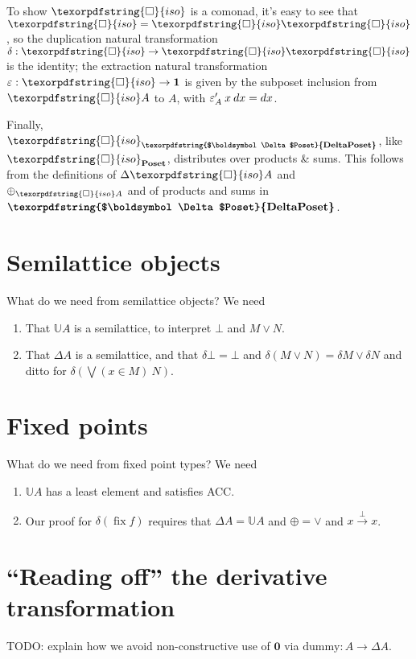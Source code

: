 \documentclass{rntz}\usepackage[a5]{rntzgeometry}\usepackage[fullwidth=13cm,width=320pt,width=115mm]{narrow}
\newcommand\mathvar[1]{\ensuremath{#1}} %
\newcommand\todo[1]{{\color{ACMRed}#1}}
\newcommand\cat\textbf
\newcommand\CP{\cat{\texorpdfstring{$\boldsymbol\Delta$Poset}{DeltaPoset}}}
\newcommand\Poset{\cat{Poset}}
\newcommand\D\Delta
\newcommand\zero{\ensuremath{\mathbold{0}}}
\newcommand\<{\mskip 4mu plus 4mu minus 1mu}
\newcommand\dx{\mathvar{dx}}
\newcommand\iso{{\texorpdfstring{\ensuremath{\square}}{iso}}}
\newcommand\isof{\iso}
\newcommand\fname\text
\newcommand\valfn{\ensuremath{\mathbb{U}}}
\newcommand\vals{\valfn}
\newcommand\chgs[1]{\D{#1}}
\newcommand\deriv[1]{\ensuremath{#1'}}
\newcommand\upd{\mathbin{\oplus}}
\newcommand\updfn{\ensuremath{{\upd}}}
\newcommand\validarrow\to
\newcommand\valid[1]{\mathrel{\overset{#1}{\validarrow}}}
\begin{document}
\noindent
To show $\iso$ is a comonad, it's easy to see that ${\iso} = {\iso\iso}$, so the
duplication natural transformation $\delta : {\iso} \to {\iso\iso}$ is the
identity; the extraction natural transformation $\varepsilon : {\iso} \to
\mathbold{1}$ is given by the subposet inclusion from $\isof A$ to $A$, with
$\deriv{\varepsilon_A} \<x \<\dx = \dx$.

Finally, $\iso_\CP$, like $\iso_\Poset$, distributes over products \& sums. This
follows from the definitions of $\chgs{\iso A}$ and $\updfn_{\iso A}$ and of
products and sums in $\CP$.


\section{Semilattice objects}

\todo{What do we need from semilattice objects? We need
  \begin{enumerate}
  \item That $\vals A$ is a semilattice, to interpret $\bot$ and $M \vee N$.
  \item That $\chgs A$ is a semilattice, and that $\delta\bot = \bot$ and
    $\delta(M \vee N) = \delta M \vee \delta N$ and ditto for $\delta(\bigvee(x
    \in M)~N)$.
  \end{enumerate}
}


\section{Fixed points}

\todo{What do we need from fixed point types? We need
  \begin{enumerate}
  \item $\vals A$ has a least element and satisfies ACC.
  \item Our proof for $\delta(\mathop{\text{fix}} f)$ requires that $\chgs A =
    \vals A$ and $\updfn = {\vee}$ and $x \valid{\bot} x$.
  \end{enumerate}
}


\section{``Reading off'' the derivative transformation}
\label{sec:derivative-transform}

\todo{TODO: explain how we avoid non-constructive use of $\zero$ via
  $\fname{dummy} : A \to \chgs A$.}
\end{document}

